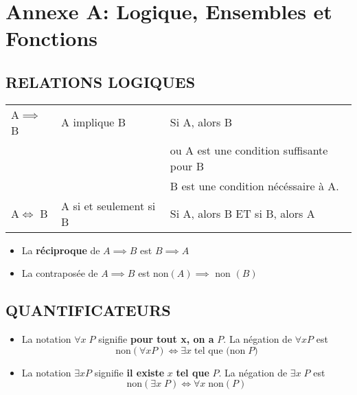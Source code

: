 \section{\textbf{Annexe A: Logique, Ensembles et Fonctions}}
\renewcommand{\thesection}{A}
\subsection*{\textbf{RELATIONS LOGIQUES}}
\begin{tabular}{ l l l }
A$\implies$ B & A implique B & Si A, alors B \\
& & ou A est une condition suffisante pour B\\
& & B est une condition nécéssaire à A.\\
\hline
A$\iff$ B & A si et seulement si B & Si A, alors B ET si B, alors A
\end{tabular}  

\begin{itemize}
    \item La \textbf{réciproque} de $ A \implies B $ est $ B \implies A $\\
    \item La contraposée de $A \implies B$ est non$(A) \implies$ non $(B)$ 
\end{itemize}
\subsection*{\textbf{QUANTIFICATEURS} }
\begin{itemize}
    \item La notation $\forall x\;P$ signifie \textbf{pour tout x, on a } $P$. La négation de $\forall x P $ est \[\text{non} (\forall x P) \iff \exists x\; \text{tel que (non} \;P)\]
    \item La notation $\exists x P$ signifie \textbf{il existe} $x$  \textbf{tel que} $P$. La négation de $\exists x\;P$ est 
    \[
    \text{non} (\exists x\;P) \iff \forall x\; \text{non}(P)\] 
\end{itemize}




